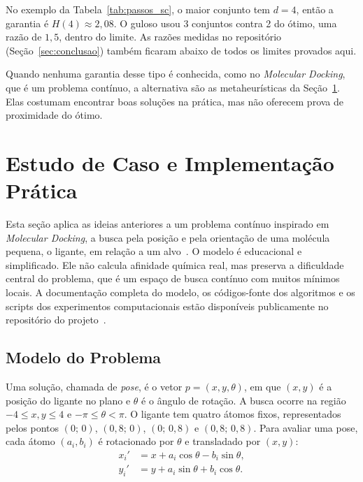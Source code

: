 \documentclass[conference]{IEEEtran}
\theoremstyle{definition}
\theoremstyle{plain}
\begin{document}
No exemplo da Tabela~\ref{tab:passos_sc}, o maior conjunto tem $d = 4$, então a garantia é $H(4) \approx 2{,}08$. O guloso usou 3 conjuntos contra 2 do ótimo, uma razão de $1{,}5$, dentro do limite. As razões medidas no repositório (Seção~\ref{sec:conclusao}) também ficaram abaixo de todos os limites provados aqui.

Quando nenhuma garantia desse tipo é conhecida, como no \textit{Molecular Docking}, que é um problema contínuo, a alternativa são as metaheurísticas da Seção~\ref{sec:estudo_de_caso}. Elas costumam encontrar boas soluções na prática, mas não oferecem prova de proximidade do ótimo.

\section{Estudo de Caso e Implementação Prática}
\label{sec:estudo_de_caso}

Esta seção aplica as ideias anteriores a um problema contínuo inspirado em \textit{Molecular Docking}, a busca pela posição e pela orientação de uma molécula pequena, o ligante, em relação a um alvo~\cite{pagadala2017software}. O modelo é educacional e simplificado. Ele não calcula afinidade química real, mas preserva a dificuldade central do problema, que é um espaço de busca contínuo com muitos mínimos locais. A documentação completa do modelo, os códigos-fonte dos algoritmos e os scripts dos experimentos computacionais estão disponíveis publicamente no repositório do projeto~\cite{repo2026np}.

\subsection{Modelo do Problema}
\label{subsec:modelo}

Uma solução, chamada de \textit{pose}, é o vetor $p = (x, y, \theta)$, em que $(x, y)$ é a posição do ligante no plano e $\theta$ é o ângulo de rotação. A busca ocorre na região $-4 \le x, y \le 4$ e $-\pi \le \theta < \pi$. O ligante tem quatro átomos fixos, representados pelos pontos $(0;\,0)$, $(0{,}8;\,0)$, $(0;\,0{,}8)$ e $(0{,}8;\,0{,}8)$. Para avaliar uma pose, cada átomo $(a_i, b_i)$ é rotacionado por $\theta$ e transladado por $(x, y)$:
\begin{equation}
\begin{aligned}
x_i' &= x + a_i \cos\theta - b_i \sin\theta,\\
y_i' &= y + a_i \sin\theta + b_i \cos\theta.
\end{aligned}
\end{equation}
\end{document}
